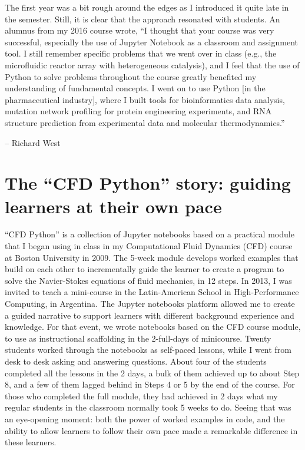 \documentclass[]{book}
\begin{document}
The first year was a bit rough around the edges as I introduced it
quite late in the semester. Still, it is clear that the approach
resonated with students. An alumnus from my 2016 course wrote, ``I
thought that your course was very successful, especially the use of
Jupyter Notebook as a classroom and assignment tool. I still remember
specific problems that we went over in class (e.g., the microfluidic
reactor array with heterogeneous catalysis), and I feel that the use
of Python to solve problems throughout the course greatly benefited my
understanding of fundamental concepts. I went on to use Python {[}in
the pharmaceutical industry{]}, where I built tools for bioinformatics
data analysis, mutation network profiling for protein engineering
experiments, and RNA structure prediction from experimental data and
molecular thermodynamics.''

-- Richard West

\hypertarget{the-cfd-python-story-guiding-learners-at-their-own-pace}{%
\section{The ``CFD Python'' story: guiding learners at their own pace}\label{the-cfd-python-story-guiding-learners-at-their-own-pace}}

``CFD Python'' is a collection of Jupyter notebooks based on a practical
module that I began using in class in my Computational Fluid Dynamics
(CFD) course at Boston University in 2009. The 5-week module develops
worked examples that build on each other to incrementally guide the
learner to create a program to solve the Navier-Stokes equations of
fluid mechanics, in 12 steps. In 2013, I was invited to teach a
mini-course in the Latin-American School in High-Performance
Computing, in Argentina. The Jupyter notebooks platform allowed me to
create a guided narrative to support learners with different
background experience and knowledge. For that event, we wrote
notebooks based on the CFD course module, to use as instructional
scaffolding in the 2-full-days of minicourse. Twenty students worked
through the notebooks as self-paced lessons, while I went from desk to
desk asking and answering questions. About four of the students
completed all the lessons in the 2 days, a bulk of them achieved up to
about Step 8, and a few of them lagged behind in Steps 4 or 5 by the
end of the course. For those who completed the full module, they had
achieved in 2 days what my regular students in the classroom normally
took 5 weeks to do. Seeing that was an eye-opening moment: both the
power of worked examples in code, and the ability to allow learners to
follow their own pace made a remarkable difference in these learners.
\end{document}
